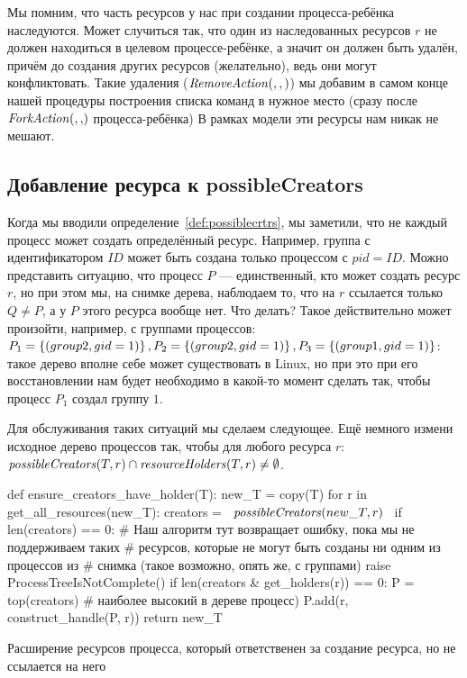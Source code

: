 \begin{note}
Мы помним, что часть ресурсов у нас при создании процесса-ребёнка наследуются. Может случиться так, что один из наследованных ресурсов $r$ не должен находиться в целевом процессе-ребёнке, а значит он должен быть удалён, причём до создания других ресурсов (желательно), ведь они могут конфликтовать. Такие удаления ($\text{\textit{RemoveAction}}(, , )$) мы добавим в самом конце нашей процедуры построения списка команд в нужное место (сразу после $\crfork{}{}$ процесса-ребёнка) В рамках модели эти ресурсы нам никак не мешают.
\end{note}

\subsection{Добавление ресурса к possibleCreators}

Когда мы вводили определение~\ref{def:possiblecrtrs}, мы заметили, что не каждый процесс может создать определённый ресурс. Например, группа с идентификатором $ID$ может быть создана только процессом с $pid = ID$. Можно представить ситуацию, что процесс $P$ --- единственный, кто может создать ресурс $r$, но при этом мы, на снимке дерева, наблюдаем то, что на $r$ ссылается только $Q \neq P$, а у $P$ этого ресурса вообще нет. Что делать? Такое действительно может произойти, например, с группами процессов: $P_1 = \left\lbrace (group 2, gid=1) \right\rbrace, P_2 = \left\lbrace (group 2, gid=1) \right\rbrace, P_3 = \left\lbrace (group 1, gid=1) \right\rbrace$: такое дерево вполне себе может существовать в Linux, но при это при его восстановлении нам будет необходимо в какой-то момент сделать так, чтобы процесс $P_1$ создал группу $1$.

Для обслуживания таких ситуаций мы сделаем следующее. Ещё немного измени исходное дерево процессов так, чтобы для любого ресурса $r$: $\text{\textit{possibleCreators}}(T, r) \cap \text{\textit{resourceHolders}}(T, r) \neq \emptyset$.

\begin{listing}
\begin{pythoncode}
def ensure_creators_have_holder(T):
    new_T = copy(T)
    for r in get_all_resources(new_T):
        creators = ~$\possibleCreators{new\_T}{r}$~
        if len(creators) == 0:
           # Наш алгоритм тут возвращает ошибку, пока мы не поддерживаем таких
           # ресурсов, которые не могут быть созданы ни одним из процессов из
           # снимка (такое возможно, опять же, с группами)
           raise ProcessTreeIsNotComplete()
        if len(creators & get_holders(r)) == 0:
            P = top(creators)  # наиболее высокий в дереве процесс)
            P.add(r, construct_handle(P, r))
    return new_T
\end{pythoncode}
\caption{Расширение ресурсов процесса, который ответственен за создание ресурса, но не ссылается на него}
\end{listing}

